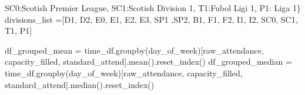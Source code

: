 \documentclass[
  letterpaper,
  DIV=11,
  numbers=noendperiod]{scrartcl}
\newenvironment{Shaded}{\begin{snugshade}}{\end{snugshade}}
\newcommand{\NormalTok}[1]{\textcolor[rgb]{0.00,0.23,0.31}{#1}}
\newcommand{\OperatorTok}[1]{\textcolor[rgb]{0.37,0.37,0.37}{#1}}
\newcommand{\StringTok}[1]{\textcolor[rgb]{0.13,0.47,0.30}{#1}}
\begin{document}
\begin{Shaded}
\begin{Highlighting}[]
              \StringTok{\textquotesingle{}SC0\textquotesingle{}}\NormalTok{:}\StringTok{\textquotesingle{}Scotish Premier League\textquotesingle{}}\NormalTok{, }\StringTok{\textquotesingle{}SC1\textquotesingle{}}\NormalTok{:}\StringTok{\textquotesingle{}Scotish Division 1\textquotesingle{}}\NormalTok{, }\StringTok{\textquotesingle{}T1\textquotesingle{}}\NormalTok{:}\StringTok{\textquotesingle{}Fubol Ligi 1\textquotesingle{}}\NormalTok{, }\StringTok{\textquotesingle{}P1\textquotesingle{}}\NormalTok{: }\StringTok{\textquotesingle{}Liga 1\textquotesingle{}}\NormalTok{\}}
\NormalTok{divisions\_list }\OperatorTok{=}\NormalTok{[}\StringTok{\textquotesingle{}D1\textquotesingle{}}\NormalTok{, }\StringTok{\textquotesingle{}D2\textquotesingle{}}\NormalTok{, }\StringTok{\textquotesingle{}E0\textquotesingle{}}\NormalTok{, }\StringTok{\textquotesingle{}E1\textquotesingle{}}\NormalTok{, }\StringTok{\textquotesingle{}E2\textquotesingle{}}\NormalTok{, }\StringTok{\textquotesingle{}E3\textquotesingle{}}\NormalTok{, }\StringTok{\textquotesingle{}SP1\textquotesingle{}}\NormalTok{ ,}\StringTok{\textquotesingle{}SP2\textquotesingle{}}\NormalTok{, }\StringTok{\textquotesingle{}B1\textquotesingle{}}\NormalTok{, }\StringTok{\textquotesingle{}F1\textquotesingle{}}\NormalTok{, }\StringTok{\textquotesingle{}F2\textquotesingle{}}\NormalTok{, }\StringTok{\textquotesingle{}I1\textquotesingle{}}\NormalTok{, }\StringTok{\textquotesingle{}I2\textquotesingle{}}\NormalTok{, }\StringTok{\textquotesingle{}SC0\textquotesingle{}}\NormalTok{, }\StringTok{\textquotesingle{}SC1\textquotesingle{}}\NormalTok{, }\StringTok{\textquotesingle{}T1\textquotesingle{}}\NormalTok{, }\StringTok{\textquotesingle{}P1\textquotesingle{}}\NormalTok{]}

\NormalTok{df\_grouped\_mean }\OperatorTok{=}\NormalTok{ time\_df.groupby(}\StringTok{\textquotesingle{}day\_of\_week\textquotesingle{}}\NormalTok{)[}\StringTok{\textquotesingle{}raw\_attendance\textquotesingle{}}\NormalTok{, }\StringTok{\textquotesingle{}capacity\_filled\textquotesingle{}}\NormalTok{, }\StringTok{\textquotesingle{}standard\_attend\textquotesingle{}}\NormalTok{].mean().reset\_index()}
\NormalTok{df\_grouped\_median }\OperatorTok{=}\NormalTok{ time\_df.groupby(}\StringTok{\textquotesingle{}day\_of\_week\textquotesingle{}}\NormalTok{)[}\StringTok{\textquotesingle{}raw\_attendance\textquotesingle{}}\NormalTok{, }\StringTok{\textquotesingle{}capacity\_filled\textquotesingle{}}\NormalTok{, }\StringTok{\textquotesingle{}standard\_attend\textquotesingle{}}\NormalTok{].median().reset\_index()}


\end{Highlighting}
\end{Shaded}
\end{document}
